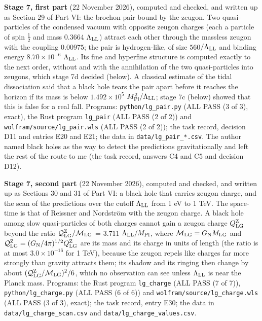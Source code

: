 \documentclass[
  10pt,
]{article}
\begin{document}
\textbf{Stage 7, first part} (22 November 2026), computed and checked,
and written up as Section 29 of Part VI: the brochon pair bound by the
zeugon. Two quasi-particles of the condensed vacuum with opposite zeugon
charges (each a particle of spin \(\tfrac12\) and mass \(0.3664\)
\(\Lambda_{\rm LL}\)) attract each other through the massless zeugon
with the coupling \(0.00975\); the pair is hydrogen-like, of size
\(560\)\(/\Lambda_{\rm LL}\) and binding energy \(8.70\times10^{-6}\)
\(\Lambda_{\rm LL}\). Its fine and hyperfine structure is computed
exactly to the next order, without and with the annihilation of the two
quasi-particles into zeugons, which stage 7d decided (below). A
classical estimate of the tidal dissociation said that a black hole
tears the pair apart before it reaches the horizon if its mass is below
\(1.492\times10^{5}\) \(M_{\rm Pl}^2/\Lambda_{\rm LL}\); stage 7c
(below) showed that this is false for a real fall. Programs:
\texttt{python/lg\_pair.py} (ALL PASS (3 of 3), exact), the Rust program
\texttt{lg\_pair} (ALL PASS (2 of 2)) and
\texttt{wolfram/source/lg\_pair.wls} (ALL PASS (2 of 2)); the task
record, decision D11 and entries E20 and E21; the data in
\texttt{data/lg\_pair\_*.csv}. The author named black holes as the way
to detect the predictions gravitationally and left the rest of the route
to me (the task record, answers C4 and C5 and decision D12).

\textbf{Stage 7, second part} (22 November 2026), computed and checked,
and written up as Sections 30 and 31 of Part VI: a black hole that
carries zeugon charge, and the scan of the predictions over the cutoff
\(\Lambda_{\rm LL}\) from 1 eV to 1 TeV. The space-time is that of
Reissner and Nordström with the zeugon charge. A black hole among slow
quasi-particles of both charges cannot gain a zeugon charge
\(Q^{\rm Z}_{\rm LG}\) beyond the ratio
\(\mathcal Q^{\rm Z}_{\rm LG}/\mathcal M_{\rm LG}\) = \(3.711\)
\(\Lambda_{\rm LL}/M_{\rm Pl}\), where
\(\mathcal M_{\rm LG}=G_{\rm N}M_{\rm LG}\) and
\(\mathcal Q^{\rm Z}_{\rm LG}=(G_{\rm N}/4\pi)^{1/2}Q^{\rm Z}_{\rm LG}\)
are its mass and its charge in units of length (the ratio is at most
\(3.0\times10^{-16}\) for 1 TeV), because the zeugon repels like charges
far more strongly than gravity attracts them; its shadow and its ringing
then change by about
\((\mathcal Q^{\rm Z}_{\rm LG}/\mathcal M_{\rm LG})^2/6\), which no
observation can see unless \(\Lambda_{\rm LL}\) is near the Planck mass.
Programs: the Rust program \texttt{lg\_charge} (ALL PASS (7 of 7)),
\texttt{python/lg\_charge.py} (ALL PASS (6 of 6)) and
\texttt{wolfram/source/lg\_charge.wls} (ALL PASS (3 of 3), exact); the
task record, entry E30; the data in \texttt{data/lg\_charge\_scan.csv}
and \texttt{data/lg\_charge\_values.csv}.
\end{document}
